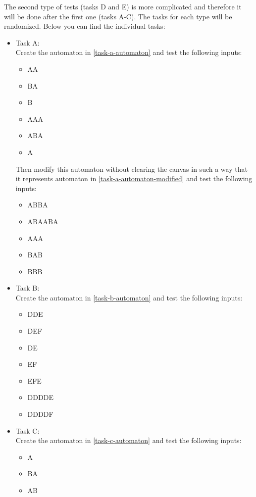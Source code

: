 The second type of tests (tasks D and E) is more complicated and therefore it will be done after the first one (tasks A-C). The tasks for each type will be randomized. Below you can find the individual tasks:

\begin{itemize}
    \item Task A:\\ 
    Create the automaton in \ref{task-a-automaton} and test the following inputs:
    \begin{itemize}
        \item AA
        \item BA
        \item B
        \item AAA
        \item ABA
        \item A
    \end{itemize}
    Then modify this automaton without clearing the canvas in such a way that it represents automaton in \ref{task-a-automaton-modified} and test the following inputs:
    \begin{itemize}
        \item ABBA
        \item ABAABA
        \item AAA
        \item BAB
        \item BBB
    \end{itemize}
    \item Task B:\\ 
    Create the automaton in \ref{task-b-automaton} and test the following inputs:
    \begin{itemize}
        \item DDE
        \item DEF
        \item DE
        \item EF
        \item EFE
        \item DDDDE
        \item DDDDF
    \end{itemize}
    \item Task C:\\ 
    Create the automaton in \ref{task-c-automaton} and test the following inputs:
    \begin{itemize}
        \item A
        \item BA
        \item AB

\end{itemize}
\end{itemize}
